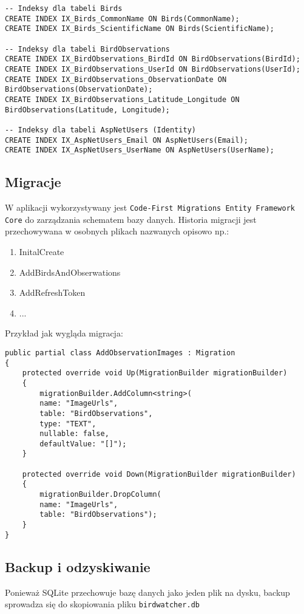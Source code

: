 \begin{lstlisting}[style=sqlstyle, caption={Indeksy bazy danych}]
-- Indeksy dla tabeli Birds
CREATE INDEX IX_Birds_CommonName ON Birds(CommonName);
CREATE INDEX IX_Birds_ScientificName ON Birds(ScientificName);

-- Indeksy dla tabeli BirdObservations
CREATE INDEX IX_BirdObservations_BirdId ON BirdObservations(BirdId);
CREATE INDEX IX_BirdObservations_UserId ON BirdObservations(UserId);
CREATE INDEX IX_BirdObservations_ObservationDate ON BirdObservations(ObservationDate);
CREATE INDEX IX_BirdObservations_Latitude_Longitude ON BirdObservations(Latitude, Longitude);

-- Indeksy dla tabeli AspNetUsers (Identity)
CREATE INDEX IX_AspNetUsers_Email ON AspNetUsers(Email);
CREATE INDEX IX_AspNetUsers_UserName ON AspNetUsers(UserName);
\end{lstlisting}

\subsection{Migracje}
W aplikacji wykorzystywany jest \texttt{Code-First Migrations Entity Framework Core} do zarządzania schematem bazy danych.
Historia migracji jest przechowywana w osobnych plikach nazwanych opisowo np.:
\begin{enumerate}
	\item InitalCreate
	\item AddBirdsAndObserwations
	\item AddRefreshToken
	\item ...
\end{enumerate}


Przykład jak wygląda migracja:

\begin{lstlisting}[style=csharp, caption={Przykład migracji bazy danych}]
public partial class AddObservationImages : Migration
{
	protected override void Up(MigrationBuilder migrationBuilder)
	{
		migrationBuilder.AddColumn<string>(
		name: "ImageUrls",
		table: "BirdObservations",
		type: "TEXT",
		nullable: false,
		defaultValue: "[]");
	}
	
	protected override void Down(MigrationBuilder migrationBuilder)
	{
		migrationBuilder.DropColumn(
		name: "ImageUrls",
		table: "BirdObservations");
	}
}
\end{lstlisting}

\subsection{Backup i odzyskiwanie}
Ponieważ SQLite przechowuje bazę danych jako jeden plik na dysku, backup sprowadza się do skopiowania pliku \texttt{birdwatcher.db}

